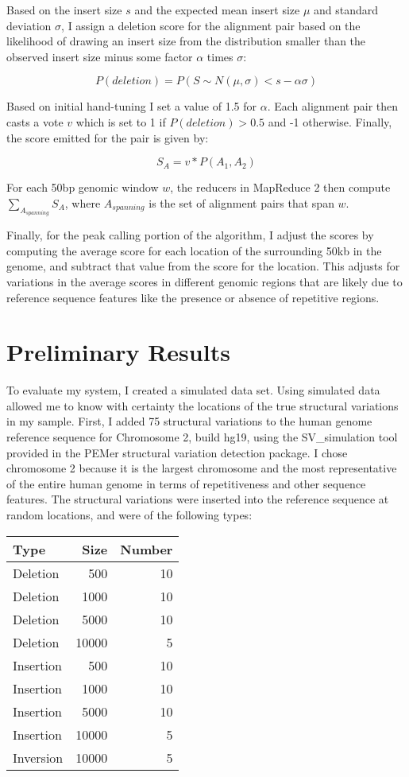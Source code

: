 \documentclass[11pt]{amsart}
\begin{document}
Based on the insert size $s$ and the expected mean insert size $\mu$ and standard deviation $\sigma$, I assign a deletion score for the alignment pair based on the likelihood of drawing an insert size from the distribution smaller than the observed insert size minus some factor $\alpha$ times $\sigma$:

\[ P(deletion) = P(S \sim N(\mu,\sigma) < s - \alpha \sigma) \]

Based on initial hand-tuning I set a value of 1.5 for $\alpha$. Each alignment pair then casts a vote $v$ which is set to 1 if $P(deletion) > 0.5$ and -1 otherwise. Finally, the score emitted for the pair is given by:

\[ S_A = v * P(A_1, A_2) \]

For each 50bp genomic window $w$, the reducers in MapReduce 2 then compute $\sum_{A_{spanning}} S_A$, where $A_{spanning}$ is the set of alignment pairs that span $w$.

Finally, for the peak calling portion of the algorithm, I adjust the scores by computing the average score for each location of the surrounding 50kb in the genome, and subtract that value from the score for the location. This adjusts for variations in the average scores in different genomic regions that are likely due to reference sequence features like the presence or absence of repetitive regions.

\section{Preliminary Results}

To evaluate my system, I created a simulated data set. Using simulated data allowed me to know with certainty the locations of the true structural variations in my sample. First, I added 75 structural variations to the human genome reference sequence for Chromosome 2, build hg19, using the {SV\_simulation} tool provided in the PEMer\cite{Korbel:2009p7} structural variation detection package. I chose chromosome 2 because it is the largest chromosome and the most representative of the entire human genome in terms of repetitiveness and other sequence features. The structural variations were inserted into the reference sequence at random locations, and were of the following types:

\begin{center}
\begin{tabular}{ | l | r | r | }
  \hline
  Type & Size & Number \\
  \hline
  Deletion & 500 & 10 \\
  Deletion & 1000 & 10 \\
  Deletion & 5000 & 10 \\
  Deletion & 10000 & 5 \\
  Insertion & 500 & 10 \\
  Insertion & 1000 & 10 \\
  Insertion & 5000 & 10 \\
  Insertion & 10000 & 5 \\
  Inversion & 10000 & 5 \\
\hline  
\end{tabular}
\end{center}
\end{document}
